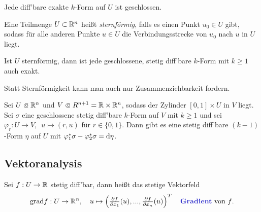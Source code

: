 \documentclass{cheat-sheet}
\newcommand{\grad}{\mathrm{grad}} %
\theoremstyle{definition}
\begin{document}
\begin{beobachtung}
  Jede diff'bare exakte $k$-Form auf $U$ ist geschlossen.
\end{beobachtung}


\begin{defn}
  Eine Teilmenge $U \subset \mathbb{R}^n$ heißt \emph{sternförmig}, falls es einen Punkt $u_0 \in U$ gibt, sodass für alle anderen Punkte $u \in U$ die Verbindungsstrecke von $u_0$ nach $u$ in $U$ liegt.
\end{defn}

\begin{lem}[Poincaré]
  Ist $U$ sternförmig, dann ist jede geschlossene, stetig diff'bare $k$-Form mit $k \geq 1$ auch exakt.
\end{lem}

\begin{bem}
  Statt Sternförmigkeit kann man auch nur Zusammenziehbarkeit fordern.
\end{bem}


\begin{samepage}

\begin{lem}
  Sei $U \opn \R^n$ und $V \opn R^{n{+}1} = \R \times \R^n$, sodass der Zylinder $[0,1] \times U$ in $V$ liegt. Sei $\sigma$ eine geschlossene stetig diff'bare $k$-Form auf $V$ mit $k \geq 1$ und sei $\varphi_r : U \to V, \enspace u \mapsto (r, u)$ für $r \in \{ 0, 1 \}$.
  Dann gibt es eine stetig diff'bare $(k{-}1)$-Form $\eta$ auf $U$ mit $\varphi_1^* \sigma - \varphi_2^* \sigma = \mathrm{d} \eta$.
\end{lem}


\subsection{Vektoranalysis}

\end{samepage}


\begin{defn}
  Sei $f : U \to \mathbb{R}$ stetig diff'bar, dann heißt das stetige Vektorfeld
  \[
    \grad f : U \to \R^n, \quad
    u \mapsto \left( \tfrac{\partial f}{\partial x_1} (u), ..., \tfrac{\partial f}{\partial x_n} (u) \right)^T
    \quad \text{\emph{Gradient} von $f$.}
  \]
\end{defn}
\end{document}
